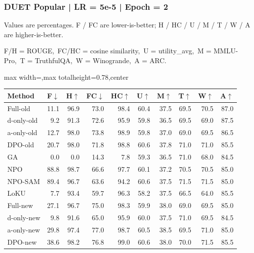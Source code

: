 \documentclass[aspectratio=169,11pt]{beamer}
\begin{document}
\begin{frame}[t]
\frametitle{DUET Popular | LR = 5e-5 | Epoch = 2}
{\tiny Values are percentages. F / FC are lower-is-better; H / HC / U / M / T / W / A are higher-is-better.}

{\tiny F/H = ROUGE,\ FC/HC = cosine similarity,\ U = utility\_avg,\ M = MMLU-Pro,\ T = TruthfulQA,\ W = Winogrande,\ A = ARC.}

\vspace{0.35em}
\centering
\scriptsize
\setlength{\tabcolsep}{3.6pt}
\renewcommand{\arraystretch}{1.05}
\begin{adjustbox}{max width=\textwidth,max totalheight=0.78\textheight,center}
\begin{tabular}{l*{9}{r}}
\toprule
Method & F$\downarrow$ & H$\uparrow$ & FC$\downarrow$ & HC$\uparrow$ & U$\uparrow$ & M$\uparrow$ & T$\uparrow$ & W$\uparrow$ & A$\uparrow$ \\
\midrule
\rowcolor{blue!10}
Full-old & 11.1 & 96.9 & 73.0 & 98.4 & 60.4 & 37.5 & 69.5 & 70.5 & 87.0 \\
\rowcolor{orange!10}
d-only-old & 9.2 & 91.3 & 72.6 & 95.9 & 59.8 & 36.5 & 69.5 & 69.0 & 87.5 \\
\rowcolor{green!10}
a-only-old & 12.7 & 98.0 & 73.8 & 98.9 & 59.8 & 37.0 & 69.0 & 69.5 & 86.5 \\
\rowcolor{gray!8}
DPO-old & 20.7 & 98.0 & 71.8 & 98.8 & 60.6 & 37.8 & 71.0 & 71.0 & 85.5 \\
\rowcolor{gray!8}
GA & 0.0 & 0.0 & 14.3 & 7.8 & 59.3 & 36.5 & 71.0 & 68.0 & 84.5 \\
\rowcolor{gray!8}
NPO & 88.8 & 98.7 & 66.6 & 97.7 & 60.1 & 37.2 & 70.5 & 70.5 & 85.0 \\
\rowcolor{gray!8}
NPO-SAM & 89.4 & 96.7 & 63.6 & 94.2 & 60.6 & 37.5 & 71.5 & 71.5 & 85.0 \\
\rowcolor{gray!8}
LoKU & 7.7 & 93.4 & 59.7 & 96.3 & 58.2 & 37.5 & 66.5 & 64.0 & 85.5 \\
\rowcolor{blue!20}
Full-new & 27.1 & 96.7 & 75.0 & 98.3 & 59.9 & 38.0 & 69.0 & 69.5 & 85.0 \\
\rowcolor{orange!20}
d-only-new & 9.8 & 91.6 & 65.0 & 95.9 & 60.0 & 37.5 & 71.0 & 69.5 & 84.5 \\
\rowcolor{green!20}
a-only-new & 29.8 & 97.4 & 77.0 & 98.7 & 60.5 & 38.5 & 69.5 & 71.0 & 85.0 \\
\rowcolor{gray!15}
DPO-new & 38.6 & 98.2 & 76.8 & 99.0 & 60.6 & 38.0 & 70.0 & 71.5 & 85.5 \\
\bottomrule
\end{tabular}
\end{adjustbox}
\end{frame}
\end{document}
